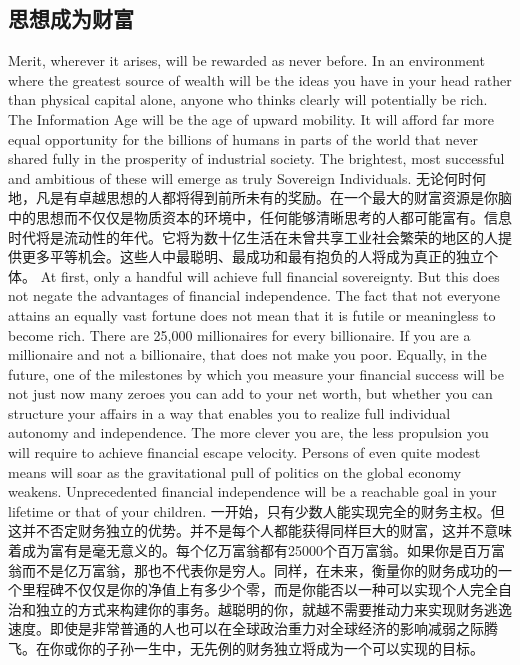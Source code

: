 \subsection{思想成为财富}
\begin{paracol}{2}[]Merit, wherever it arises, will be rewarded as never before. In an environment where the greatest source of wealth will be the ideas you have in your head rather than physical capital alone, anyone who thinks clearly will potentially be rich. The Information Age will be the age of upward mobility. It will afford far more equal opportunity for the billions of humans in parts of the world that never shared fully in the prosperity of industrial society. The brightest, most successful and ambitious of these will emerge as truly Sovereign Individuals. 
\switchcolumn
无论何时何地，凡是有卓越思想的人都将得到前所未有的奖励。在一个最大的财富资源是你脑中的思想而不仅仅是物质资本的环境中，任何能够清晰思考的人都可能富有。信息时代将是流动性的年代。它将为数十亿生活在未曾共享工业社会繁荣的地区的人提供更多平等机会。这些人中最聪明、最成功和最有抱负的人将成为真正的独立个体。
\switchcolumn*
At first, only a handful will achieve full financial sovereignty. But this does not negate the advantages of financial independence. The fact that not everyone attains an equally vast fortune does not mean that it is futile or meaningless to become rich. There are 25,000 millionaires for every billionaire. If you are a millionaire and not a billionaire, that does not make you poor. Equally, in the future, one of the milestones by which you measure your financial success will be not just now many zeroes you can add to your net worth, but whether you can structure your affairs in a way that enables you to realize full individual autonomy and independence. The more clever you are, the less propulsion you will require to achieve financial escape velocity. Persons of even quite modest means will soar as the gravitational pull of politics on the global economy weakens. Unprecedented financial independence will be a reachable goal in your lifetime or that of your children.
\switchcolumn
一开始，只有少数人能实现完全的财务主权。但这并不否定财务独立的优势。并不是每个人都能获得同样巨大的财富，这并不意味着成为富有是毫无意义的。每个亿万富翁都有25000个百万富翁。如果你是百万富翁而不是亿万富翁，那也不代表你是穷人。同样，在未来，衡量你的财务成功的一个里程碑不仅仅是你的净值上有多少个零，而是你能否以一种可以实现个人完全自治和独立的方式来构建你的事务。越聪明的你，就越不需要推动力来实现财务逃逸速度。即使是非常普通的人也可以在全球政治重力对全球经济的影响减弱之际腾飞。在你或你的子孙一生中，无先例的财务独立将成为一个可以实现的目标。

\end{paracol}
